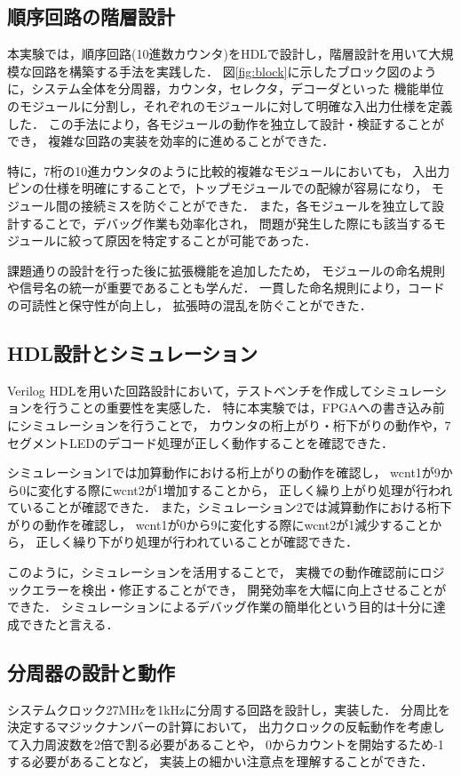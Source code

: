 \documentclass[a4paper,11pt]{ltjsarticle}
\begin{document}
\subsection{順序回路の階層設計}
本実験では，順序回路(10進数カウンタ)をHDLで設計し，階層設計を用いて大規模な回路を構築する手法を実践した．
図\ref{fig:block}に示したブロック図のように，システム全体を分周器，カウンタ，セレクタ，デコーダといった
機能単位のモジュールに分割し，それぞれのモジュールに対して明確な入出力仕様を定義した．
この手法により，各モジュールの動作を独立して設計・検証することができ，
複雑な回路の実装を効率的に進めることができた．

特に，7桁の10進カウンタのように比較的複雑なモジュールにおいても，
入出力ピンの仕様を明確にすることで，トップモジュールでの配線が容易になり，
モジュール間の接続ミスを防ぐことができた．
また，各モジュールを独立して設計することで，デバッグ作業も効率化され，
問題が発生した際にも該当するモジュールに絞って原因を特定することが可能であった．

課題通りの設計を行った後に拡張機能を追加したため，
モジュールの命名規則や信号名の統一が重要であることも学んだ．
一貫した命名規則により，コードの可読性と保守性が向上し，
拡張時の混乱を防ぐことができた．

\subsection{HDL設計とシミュレーション}
Verilog HDLを用いた回路設計において，テストベンチを作成してシミュレーションを行うことの重要性を実感した．
特に本実験では，FPGAへの書き込み前にシミュレーションを行うことで，
カウンタの桁上がり・桁下がりの動作や，7セグメントLEDのデコード処理が正しく動作することを確認できた．

シミュレーション1では加算動作における桁上がりの動作を確認し，
wcnt1が9から0に変化する際にwcnt2が1増加することから，
正しく繰り上がり処理が行われていることが確認できた．
また，シミュレーション2では減算動作における桁下がりの動作を確認し，
wcnt1が0から9に変化する際にwcnt2が1減少することから，
正しく繰り下がり処理が行われていることが確認できた．

このように，シミュレーションを活用することで，
実機での動作確認前にロジックエラーを検出・修正することができ，
開発効率を大幅に向上させることができた．
シミュレーションによるデバッグ作業の簡単化という目的は十分に達成できたと言える．

\subsection{分周器の設計と動作}
システムクロック27MHzを1kHzに分周する回路を設計し，実装した．
分周比を決定するマジックナンバーの計算において，
出力クロックの反転動作を考慮して入力周波数を2倍で割る必要があることや，
0からカウントを開始するため-1する必要があることなど，
実装上の細かい注意点を理解することができた．
\end{document}
